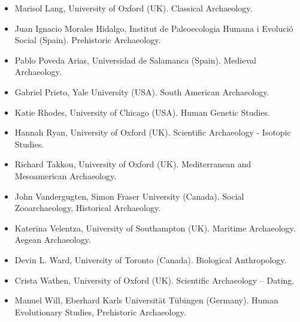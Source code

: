 \begin{footnotesize}
\begin{multicols}{2}
\begin{itemize}
\item Marisol Lang, University of Oxford (UK). Classical Archaeology.
\item Juan Ignacio Morales Hidalgo, Institut de Paleoecologia Humana i Evolució Social (Spain). Prehistoric Archaeology.
\item Pablo Poveda Arias, Universidad de Salamanca (Spain). Medieval Archaeology.
\item Gabriel Prieto, Yale University (USA). South American Archaeology.
\item Katie Rhodes, University of Chicago (USA). Human Genetic Studies.
\item Hannah Ryan, University of Oxford (UK). Scientific Archaeology - Isotopic Studies.
\item Richard Takkou, University of Oxford (UK). Mediterranean and Mesoamerican Archaeology.
\item John Vandergugten, Simon Fraser University (Canada). Social Zooarchaeology, Historical Archaeology.
\item Katerina Velentza, University of Southampton (UK). Maritime Archaeology. Aegean Archaeology.
\item Devin L. Ward, University of Toronto (Canada). Biological Anthropology.
\item Crista Wathen, University of Oxford (UK). Scientific Archaeology – Dating.
\item Manuel Will, Eberhard Karls Universität Tübingen (Germany). Human Evolutionary Studies, Prehistoric Archaeology.
\end{itemize}
\end{multicols}
\end{footnotesize}
